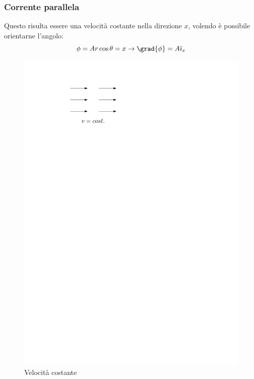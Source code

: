 \subsubsection{Corrente parallela}
Questo risulta essere una velocità costante nella direzione $x$, volendo è possibile orientarne l'angolo:
%
	\begin{equation*}
		\phi = A r \cos{\theta} = x \rightarrow \grad{\phi} = A \hat{\imath}_x
	\end{equation*}
%
	\begin{figure}[ht]
		\includegraphics[scale=0.7]{./7.3 Flusso irrotazionale/7.3-4-2}
		\centering
		\caption{Velocità costante}
	\end{figure}
%

